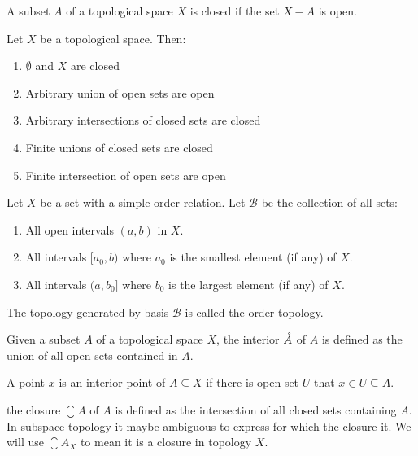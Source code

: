 \begin{definition}
    A subset $A$ of a topological space $X$ is closed if the set $X - A$ is open.
\end{definition}

\begin{definition}
    Let $X$ be a topological space. Then:
    \begin{enumerate}
        \item $\emptyset$ and $X$ are closed
        \item Arbitrary union of open sets are open
        \item Arbitrary intersections of closed sets are closed
        \item Finite unions of closed sets are closed
        \item Finite intersection of open sets are open
    \end{enumerate}
\end{definition}



\begin{definition}
    Let $X$ be a set with a simple order relation. Let $\mathcal{B}$ be the collection of all sets:
    \begin{enumerate}
        \item All open intervals $(a,b)$ in $X$.
        \item All intervals $[a_0, b)$ where $a_0$ is the smallest element (if any) of $X$.
        \item All intervals $(a, b_0]$ where $b_0$ is the largest element (if any) of $X$.
    \end{enumerate}
    The topology generated by basis $\mathcal{B}$ is called the order topology.
\end{definition}



\begin{definition}
    Given a subset $A$ of a topological space $X$, the interior $\mathring{A}$ of $A$ is defined as the union of all open sets contained in $A$.
\end{definition}


\begin{definition}
    A point $x$ is an interior point of $A \subseteq X$ if there is open set $U$ that $x \in U \subseteq A$.
\end{definition}


\begin{definition}
    the closure $\closure{A}$ of $A$ is defined as the intersection of all closed sets containing $A$. In subspace topology it maybe ambiguous to express for which the closure it. We will use $\closure{A}_X$ to mean it is a closure in topology $X$.
\end{definition}


